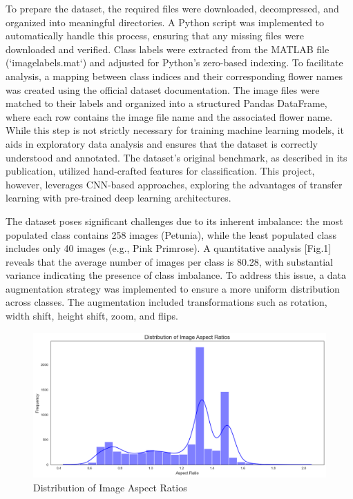 \vspace{0.3cm}

To prepare the dataset, the required files were downloaded, decompressed, and organized into meaningful directories.
A Python script was implemented to automatically handle this process, ensuring that any missing files were downloaded
and verified. Class labels were extracted from the MATLAB file (`imagelabels.mat`) and adjusted for Python’s zero-based
indexing. To facilitate analysis, a mapping between class indices and their corresponding flower names was created using
the official dataset documentation. The image files were matched to their labels and organized into a structured Pandas
DataFrame, where each row contains the image file name and the associated flower name. While this step is not strictly
necessary for training machine learning models, it aids in exploratory data analysis and ensures that the dataset is
correctly understood and annotated. The dataset's original benchmark, as described in its publication, utilized
hand-crafted features for classification. This project, however, leverages CNN-based approaches, exploring the
advantages of transfer learning with pre-trained deep learning architectures.

\vspace{0.3cm}

The dataset poses significant challenges due to its inherent imbalance: the most populated class contains 258 images
(Petunia), while the least populated class includes only 40 images (e.g., Pink Primrose). A quantitative analysis
[Fig.1] reveals that the average number of images per class is 80.28, with substantial variance indicating the presence
of class imbalance. To address this issue, a data augmentation strategy was implemented to ensure a more uniform distribution
across classes. The augmentation included transformations such as rotation, width shift, height shift, zoom, and flips.

\begin{figure}[h!]
    \centering
    \includegraphics[width=\linewidth]{Images/Distribution of Image Aspect Ratios}
    \caption{Distribution of Image Aspect Ratios}
\end{figure}

